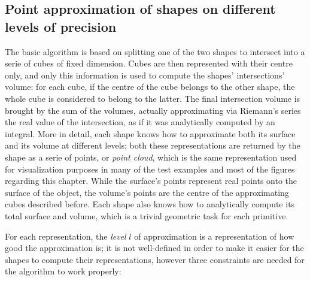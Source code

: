 \subsection{Point approximation of shapes on different levels of precision}
The basic algorithm is based on splitting one of the two shapes to intersect into a serie of cubes of
fixed dimension.
Cubes are then represented with their centre only, and only this information is
used to compute the shapes' intersections' volume: for each cube, if the centre
of the cube belongs to the other shape, the whole cube is considered to belong
to the latter. The final intersection volume is brought by the sum of the
volumes, actually approximating via Riemann's series the real value of the
intersection, as if it was
analytically computed by an integral. More in detail, each shape knows how to
approximate both its surface and its volume at different levels; both these
representations are returned by the shape as a serie of points, or \emph{point
cloud}, which is the same representation used for visualization
purposes in many of the test examples and most of the figures regarding this chapter. While the surface's points
represent real points onto the surface of the 
object, the volume's points are the centre of the approximating cubes described
before. Each shape also knows how to analytically compute its total surface and
volume, which is a trivial geometric task for each primitive.

For each representation, the \emph{level} $l$ of approximation is a representation
of how good the approximation is; it is not well-defined in order to make it
easier for the shapes to compute their representations, however three
constraints are needed for the algorithm to work properly:

